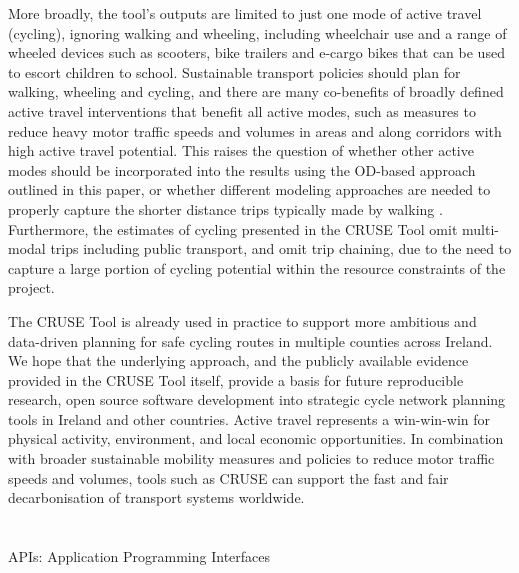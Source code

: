 \documentclass[
  super,
  preprint,
  3p]{elsarticle}
\providecommand{\DIFadd}[1]{{\protect\color{blue}\uwave{#1}}} %
\providecommand{\DIFaddbegin}{} %
\providecommand{\DIFaddend}{} %
\providecommand{\DIFdelbegin}{} %
\providecommand{\DIFdelend}{} %
\newcommand{\DIFscaledelfig}{0.5}
\newlength{\DIFdelgraphicswidth} %
\newlength{\DIFdelgraphicsheight} %
\newcommand{\DIFaddincludegraphics}[2][]{{\color{blue}\fbox{\DIFOincludegraphics[#1]{#2}}}} %
\newcommand{\DIFdelincludegraphics}[2][]{%
\sbox{\DIFdelgraphicsbox}{\DIFOincludegraphics[#1]{#2}}%
\settoboxwidth{\DIFdelgraphicswidth}{\DIFdelgraphicsbox} %
\settoboxtotalheight{\DIFdelgraphicsheight}{\DIFdelgraphicsbox} %
\scalebox{\DIFscaledelfig}{%
\parbox[b]{\DIFdelgraphicswidth}{\usebox{\DIFdelgraphicsbox}\\[-\baselineskip] \rule{\DIFdelgraphicswidth}{0em}}\llap{\resizebox{\DIFdelgraphicswidth}{\DIFdelgraphicsheight}{%
\setlength{\unitlength}{\DIFdelgraphicswidth}%
\begin{picture}(1,1)%
\thicklines\linethickness{2pt} %
{\color[rgb]{1,0,0}\put(0,0){\framebox(1,1){}}}%
{\color[rgb]{1,0,0}\put(0,0){\line( 1,1){1}}}%
{\color[rgb]{1,0,0}\put(0,1){\line(1,-1){1}}}%
\end{picture}%
}\hspace*{3pt}}} %
} %
\DeclareRobustCommand{\DIFaddbegin}{\DIFOaddbegin \let\includegraphics\DIFaddincludegraphics} %
\DeclareRobustCommand{\DIFaddend}{\DIFOaddend \let\includegraphics\DIFOincludegraphics} %
\DeclareRobustCommand{\DIFdelbegin}{\DIFOdelbegin \let\includegraphics\DIFdelincludegraphics} %
\DeclareRobustCommand{\DIFdelend}{\DIFOaddend \let\includegraphics\DIFOincludegraphics} %
\begin{document}
More broadly, the tool's outputs are limited to just one mode of active
travel (cycling), ignoring walking and wheeling, including wheelchair
use and a range of wheeled devices such as scooters, bike trailers and
e-cargo bikes that can be used to escort children to school. Sustainable
transport policies should plan for walking, wheeling and cycling, and
there are many co-benefits of broadly defined active travel
interventions that benefit all active modes, such as measures to reduce
heavy motor traffic speeds and volumes in areas and along corridors with
high active travel potential. This raises the question of whether other
active modes should be incorporated into the results using the OD-based
approach outlined in this paper, or whether different modeling
approaches are needed to properly capture the shorter distance trips
typically made by walking \citep{cooper2018}. Furthermore, the estimates
of cycling presented in the CRUSE Tool omit multi-modal trips including
public transport, and omit trip chaining, due to the need to capture a
large portion of cycling potential within the resource constraints of
the project.

The CRUSE Tool is already used in practice to support more ambitious and
data-driven planning for safe cycling routes in multiple counties across
Ireland. We hope that the underlying approach, and the publicly
available evidence provided in the CRUSE Tool itself, provide a basis
for future reproducible research, open source software development into
strategic cycle network planning tools in Ireland and other countries.
Active travel represents a win-win-win for physical activity,
environment, and local economic opportunities. In combination with
broader sustainable mobility measures and policies to reduce motor
traffic speeds and volumes, tools such as CRUSE can support the fast and
fair decarbonisation of transport systems worldwide.

\DIFdelbegin %
\DIFdelend \DIFaddbegin \section{\DIFadd{List of abbreviations}}\label{list-of-abbreviations}
\DIFaddend 

APIs: Application Programming Interfaces
\end{document}
